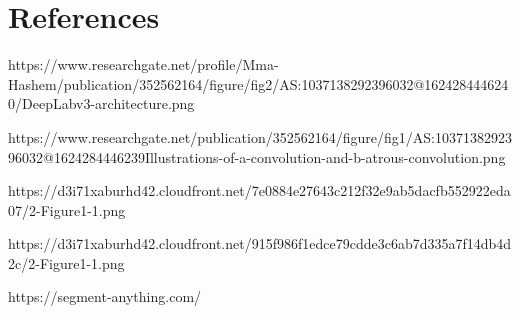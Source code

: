 \section{References}

\begin{thebibliography}{00}
 https://www.researchgate.net/profile/Mma-Hashem/publication/352562164/figure/fig2/AS:1037138292396032@1624284446240/DeepLabv3-architecture.png

 https://www.researchgate.net/publication/352562164/figure/fig1/AS:1037138292396032@1624284446239Illustrations-of-a-convolution-and-b-atrous-convolution.png

 https://d3i71xaburhd42.cloudfront.net/7e0884e27643c212f32e9ab5dacfb552922eda07/2-Figure1-1.png

 https://d3i71xaburhd42.cloudfront.net/915f986f1edce79cdde3c6ab7d335a7f14db4d2c/2-Figure1-1.png

 https://segment-anything.com/

\end{thebibliography}
